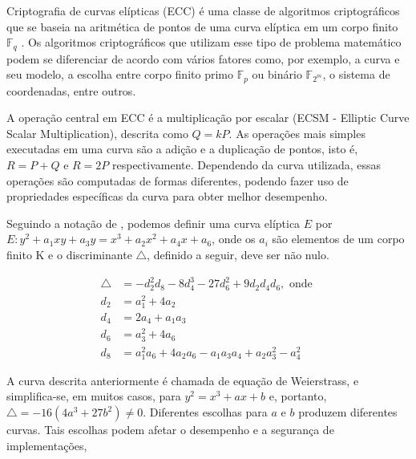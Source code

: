 Criptografia de curvas elípticas (ECC) é uma classe de algoritmos criptográficos que se baseia na aritmética de pontos de uma curva elíptica em um corpo finito $\mathbb{F}_q$ \cite{Hankerson:2003:GEC:940321}. Os algoritmos criptográficos que utilizam esse tipo de problema matemático podem se diferenciar de acordo com vários fatores como, por exemplo, a curva e seu modelo, a escolha entre corpo finito primo $\mathbb{F}_p$ ou binário $\mathbb{F}_{2^m}$, o sistema de coordenadas, entre outros.

A operação central em ECC é a multiplicação por escalar (ECSM - Elliptic Curve Scalar Multiplication), descrita como $Q = kP$. As operações mais simples executadas em uma curva são a adição e a duplicação de pontos, isto é, $R = P + Q$ e $R = 2P$ respectivamente. Dependendo da curva utilizada, essas operações são computadas de formas diferentes, podendo fazer uso de propriedades específicas da curva para obter melhor desempenho.

Seguindo a notação de  \cite{Hankerson:2003:GEC:940321},  podemos definir uma curva elíptica $E$ por $E: y^2 + a_1xy + a_3y = x^3 + a_2x^2 + a_4x + a_6$, onde os $a_i$ são elementos de um corpo finito K e o discriminante $\bigtriangleup$, definido a seguir, deve ser não nulo. 

\begin{align*}
\bigtriangleup &= -d_2^2d_8 - 8d_4^3 - 27d_6^2 + 9d_2d_4d_6, \mbox{ onde } \\
d_2 &= a_1^2 + 4a_2 \\
d_4 &= 2a_4 + a_1a_3 \\ 
d_6 &= a_3^2 + 4a_6 \\
d_8 &= a_1^2a_6 + 4a_2a_6 - a_1a_3a_4 + a_2a_3^2 - a_4^2
\end{align*}

A curva descrita anteriormente é chamada de equação de Weierstrass, e simplifica-se,  em muitos casos, para $y^2 = x^3 + ax + b$ e, portanto, $\bigtriangleup = -16(4a^3 +27b^2) \ne 0$. Diferentes escolhas para $a$ e $b$ produzem diferentes curvas. Tais escolhas podem afetar o desempenho e a segurança de implementações,  


